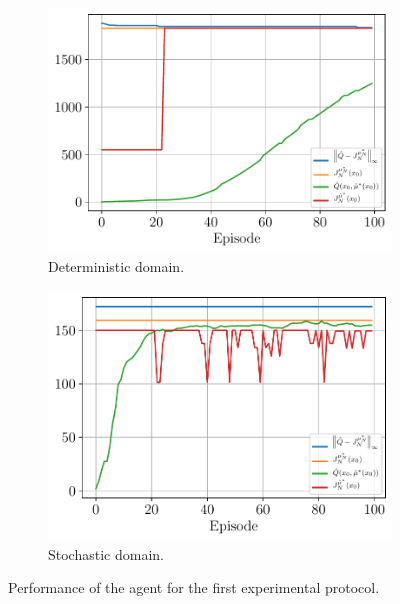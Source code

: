 \documentclass[a4paper, 12pt]{article}
\begin{document}
    \begin{figure}[h]
        \begin{subfigure}[b]{0.47\textwidth}
            \centering
            \includegraphics[width=\textwidth]{resources/pdf/5.2.1_deterministic.pdf}
            \caption{Deterministic domain.}
        \end{subfigure}
        \hfill
        \begin{subfigure}[b]{0.47\textwidth}
            \centering
            \includegraphics[width=\textwidth]{resources/pdf/5.2.1_stochastic.pdf}
            \caption{Stochastic domain.}
        \end{subfigure}
        \caption{Performance of the agent for the first experimental protocol.}
        \label{fig:ql.first.protocol}
    \end{figure}
    
\end{document}
